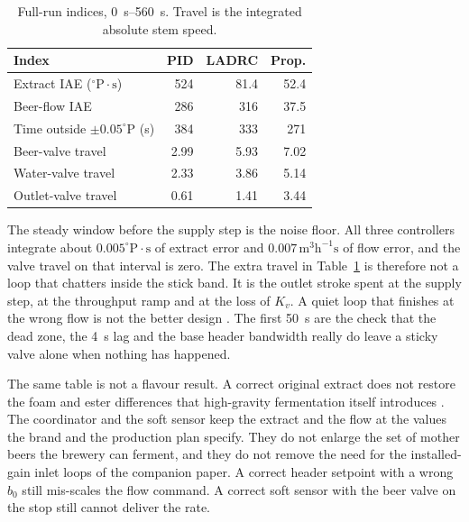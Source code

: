 \documentclass[conference,a4paper]{IEEEtran}
\newcommand{\degP}{^{\circ}\mathrm{P}}
\begin{document}
\begin{table}[!t]
\caption{Full-run indices, \SIrange{0}{560}{s}. Travel is the integrated absolute stem speed.}
\label{tab:full}
\centering
\begin{tabular}{@{}lrrr@{}}
\toprule
Index & PID & LADRC & Prop. \\
\midrule
Extract IAE ($\degP\cdot\mathrm{s}$) & 524 & 81.4 & 52.4 \\
Beer-flow IAE & 286 & 316 & 37.5 \\
Time outside $\pm 0.05\degP$ (s) & 384 & 333 & 271 \\
Beer-valve travel & 2.99 & 5.93 & 7.02 \\
Water-valve travel & 2.33 & 3.86 & 5.14 \\
Outlet-valve travel & 0.61 & 1.41 & 3.44 \\
\bottomrule
\end{tabular}
\end{table}

The steady window before the supply step is the noise floor. All three controllers integrate about $0.005\degP\cdot\mathrm{s}$ of extract error and $0.007\,\mathrm{m}^3\mathrm{h}^{-1}\mathrm{s}$ of flow error, and the valve travel on that interval is zero. The extra travel in Table~\ref{tab:full} is therefore not a loop that chatters inside the stick band. It is the outlet stroke spent at the supply step, at the throughput ramp and at the loss of $K_v$. A quiet loop that finishes at the wrong flow is not the better design \cite{bialkowski1993dreams,hagglund1995monitor}. The first \SI{50}{s} are the check that the dead zone, the \SI{4}{s} lag and the base header bandwidth really do leave a sticky valve alone when nothing has happened.

The same table is not a flavour result. A correct original extract does not restore the foam and ester differences that high-gravity fermentation itself introduces \cite{stewart2010highgravity,briggs2004brewing}. The coordinator and the soft sensor keep the extract and the flow at the values the brand and the production plan specify. They do not enlarge the set of mother beers the brewery can ferment, and they do not remove the need for the installed-gain inlet loops of the companion paper. A correct header setpoint with a wrong $b_0$ still mis-scales the flow command. A correct soft sensor with the beer valve on the stop still cannot deliver the rate.
\end{document}
